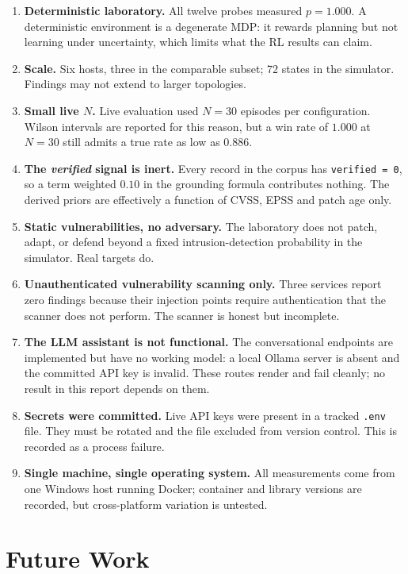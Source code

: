 \documentclass[11pt,a4paper]{report}
\newcommand{\code}[1]{\texttt{\small #1}}
\begin{document}
\begin{enumerate}[leftmargin=*]
  \item \textbf{Deterministic laboratory.} All twelve probes measured $p = 1.000$.
  A deterministic environment is a degenerate MDP: it rewards planning but not
  learning under uncertainty, which limits what the RL results can claim.
  \item \textbf{Scale.} Six hosts, three in the comparable subset; 72 states in
  the simulator. Findings may not extend to larger topologies.
  \item \textbf{Small live $N$.} Live evaluation used $N = 30$ episodes per
  configuration. Wilson intervals are reported for this reason, but a win rate
  of $1.000$ at $N = 30$ still admits a true rate as low as $0.886$.
  \item \textbf{The \emph{verified} signal is inert.} Every record in the corpus
  has \code{verified = 0}, so a term weighted $0.10$ in the grounding formula
  contributes nothing. The derived priors are effectively a function of CVSS,
  EPSS and patch age only.
  \item \textbf{Static vulnerabilities, no adversary.} The laboratory does not
  patch, adapt, or defend beyond a fixed intrusion-detection probability in the
  simulator. Real targets do.
  \item \textbf{Unauthenticated vulnerability scanning only.} Three services
  report zero findings because their injection points require authentication
  that the scanner does not perform. The scanner is honest but incomplete.
  \item \textbf{The LLM assistant is not functional.} The conversational
  endpoints are implemented but have no working model: a local Ollama server is
  absent and the committed API key is invalid. These routes render and fail
  cleanly; no result in this report depends on them.
  \item \textbf{Secrets were committed.} Live API keys were present in a tracked
  \code{.env} file. They must be rotated and the file excluded from version
  control. This is recorded as a process failure.
  \item \textbf{Single machine, single operating system.} All measurements come
  from one Windows host running Docker; container and library versions are
  recorded, but cross-platform variation is untested.
\end{enumerate}

\chapter{Future Work}
\label{sec:future}
\end{document}
